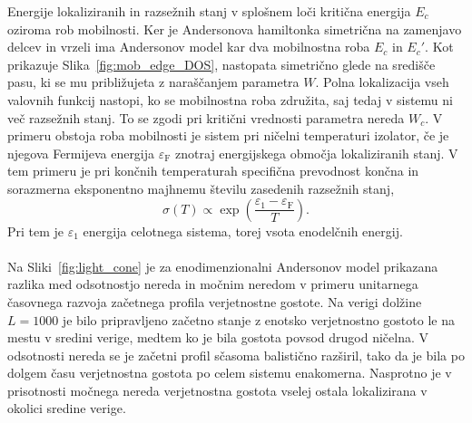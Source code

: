  Energije lokaliziranih in razsežnih stanj v splošnem loči kritična energija $E_c$ oziroma rob mobilnosti. Ker je Andersonova hamiltonka simetrična na zamenjavo delcev in vrzeli ima Andersonov model kar dva mobilnostna roba $E_c$ in $E_c'$. Kot prikazuje Slika~\ref{fig:mob_edge_DOS}, nastopata simetrično glede na središče pasu, ki se mu približujeta z naraščanjem parametra $W$. Polna lokalizacija vseh valovnih funkcij nastopi, ko se mobilnostna roba združita, saj tedaj v sistemu ni več razsežnih stanj. To se zgodi pri kritični vrednosti parametra nereda $W_c$. V primeru obstoja roba mobilnosti je sistem pri ničelni temperaturi izolator, če je njegova Fermijeva energija $\varepsilon_\mathrm{F}$ znotraj energijskega območja lokaliziranih stanj. V tem primeru je pri končnih temperaturah specifična prevodnost končna in sorazmerna eksponentno majhnemu številu zasedenih razsežnih stanj,
\begin{equation}
\sigma(T)\propto \exp\left(\frac{\varepsilon_1 - \varepsilon_\mathrm{F}}{T}\right).
\end{equation}
Pri tem je $\varepsilon_1$ energija celotnega sistema, torej vsota enodelčnih energij.  \\\\
Na Sliki~\ref{fig:light_cone} je za enodimenzionalni Andersonov model prikazana razlika med odsotnostjo nereda in močnim neredom v primeru unitarnega časovnega razvoja začetnega profila verjetnostne gostote. Na verigi dolžine $L=1000$ je bilo pripravljeno začetno stanje z enotsko verjetnostno gostoto le na mestu v sredini verige, medtem ko je bila gostota povsod drugod ničelna. V odsotnosti nereda se je začetni profil sčasoma balistično razširil, tako da je bila po dolgem času verjetnostna gostota po celem sistemu enakomerna. Nasprotno je v prisotnosti močnega nereda verjetnostna gostota vselej ostala lokalizirana v okolici sredine verige. 
